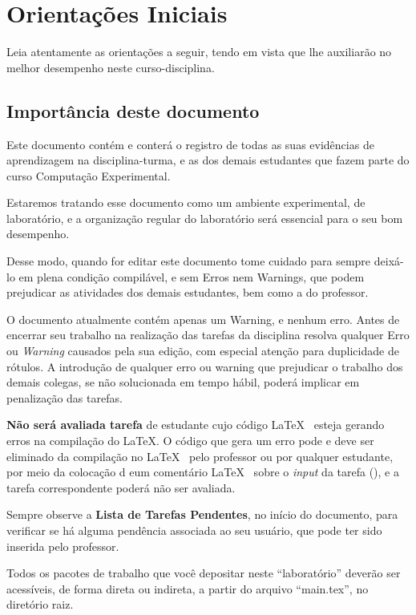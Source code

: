 \chapter{Orientações Iniciais\label{orientacoes:iniciais}}

Leia atentamente as orientações a seguir, tendo em vista que lhe auxiliarão no melhor desempenho neste curso-disciplina. 

\section{Importância deste documento}

Este documento contém e conterá o registro de todas as suas evidências de aprendizagem na disciplina-turma, e as dos demais estudantes que fazem parte do curso Computação Experimental.

Estaremos tratando esse documento como um ambiente experimental, de laboratório, e a organização regular do laboratório será essencial para o seu bom desempenho.

Desse modo, quando for editar este documento tome cuidado para sempre deixá-lo em plena condição compilável, e sem Erros nem Warnings, que podem prejudicar as atividades dos demais estudantes, bem como a do professor. 

O documento atualmente contém apenas um Warning, e nenhum erro. Antes de encerrar seu trabalho na realização das tarefas da disciplina resolva qualquer Erro ou \textit{Warning} causados pela sua edição, com especial atenção para duplicidade de rótulos.
A introdução de qualquer erro ou warning que prejudicar o trabalho dos demais colegas, se não solucionada em tempo hábil, poderá implicar em penalização das tarefas.

\textbf{Não será avaliada tarefa} de estudante cujo código \LaTeX~ esteja gerando erros na compilação do \LaTeX. O código que gera um erro pode e deve ser eliminado da compilação no \LaTeX~ pelo professor ou por qualquer estudante, por meio da colocação d eum comentário \LaTeX~ sobre o \textit{input} da tarefa (\verb||), e a tarefa correspondente poderá não ser avaliada.

Sempre observe a \textbf{Lista de Tarefas Pendentes}, no início do documento, para verificar se há alguma pendência associada ao seu usuário, que pode ter sido inserida pelo professor. 

Todos os pacotes de trabalho que você depositar neste ``laboratório'' deverão ser acessíveis, de forma direta ou indireta, a partir do arquivo ``main.tex'', no diretório raiz.

